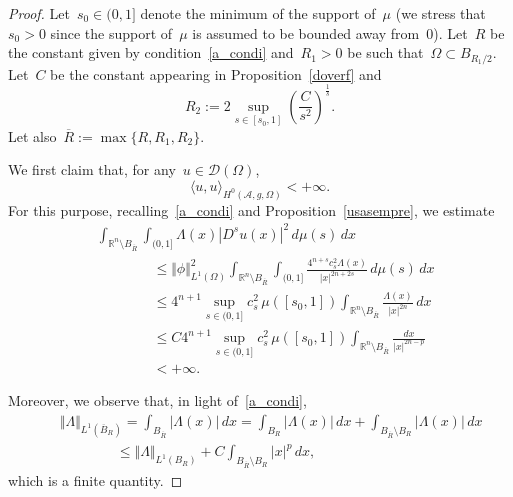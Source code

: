 \documentclass[11pt,hyp,]{nyjm}
\numberwithin{equation}{section}
\newcommand{\R}{\mathbb{R}}
\theoremstyle{remark}
\renewcommand{\leq}{\leqslant}
\renewcommand{\le}{\leqslant}
\begin{document}
\begin{proof}
Let~$s_0 \in (0,1]$ denote the minimum of the support of~$\mu$
(we stress that~$s_0>0$ since the support of~$\mu$ is assumed to be bounded away from~$0$).
Let~$R$ be the constant given by condition~\eqref{a_condi} and~$R_1>0$ be such that~$\Omega\subset B_{{R_1}/2}$.
Let~$C$ be the constant appearing in Proposition~\ref{doverf} and
\begin{equation}\label{noti354237} R_2:= 2\sup_{s\in[s_0,1]}\left(\frac{C}{s^2}\right)^{\frac1s}.\end{equation}
Let also~$\overline R:=\max\{R,R_1, R_2\}$.

We first claim that, for any~$u\in \mathcal{D}(\Omega)$,
\begin{equation}\label{940wjhfskr984hgfehgoiuerp09546}
\langle u, u \rangle_{H^{0}(\mathcal{A}, g, \Omega)}<+\infty.
\end{equation}
For this purpose, recalling~\eqref{a_condi} and Proposition~\ref{usasempre}, we estimate
\begin{equation}\begin{split}\label{pk}&
\int_{\R^n \setminus B_{\overline R}} \int_{(0,1]} \Lambda(x) |D^s u(x)|^2  \, d\mu(s) \, dx \\&\qquad\qquad\leq  \Vert{\phi}\Vert^2_{L^1(\Omega)} \int_{\R^n \setminus B_{\overline R}} \int_{(0,1]} \frac{4^{n+s}c_s^2\Lambda(x)}{|x|^{2n+2s}}  \, d\mu(s) \, dx \\ &\qquad\qquad
\leq 4^{n+1}\sup_{s\in(0,1]}c_s^2\,\mu([s_0,1]) \int_{\R^n \setminus B_{\overline R}} \frac{\Lambda(x)}{|x|^{2n}}  \, dx \\ &\qquad\qquad \leq  C  4^{n+1}\sup_{s\in(0,1]}c_s^2\,\mu([s_0,1])\int_{\R^n \setminus B_{\overline R}} \frac{dx}{|x|^{2n-p}} \\&\qquad\qquad < +\infty.
\end{split}\end{equation}

Moreover, 
we observe that, in light of~\eqref{a_condi},
\begin{eqnarray*}&&
\Vert \Lambda \Vert_{L^1(\overline B_R)}= \int_{B_{\overline R}}|\Lambda(x)|\,dx=
\int_{B_{R}}|\Lambda(x)|\,dx+\int_{B_{\overline R}\setminus B_R}|\Lambda(x)|\,dx\\&&\qquad\qquad\le \Vert \Lambda \Vert_{L^1(B_R)}+C\int_{B_{\overline R}\setminus B_R}|x|^p\,dx,
\end{eqnarray*}
which is a finite quantity.


\end{proof}
\end{document}
